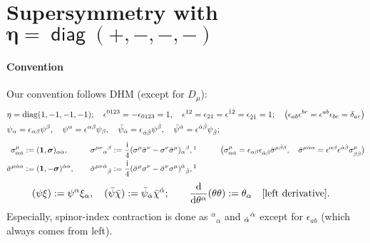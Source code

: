 \documentclass[CheatSheet]{subfiles}
\begin{document}
\section[Supersymmetry with $\eta=\diag(+,-,-,-)$]{Supersymmetry with $\bm{\eta=\mathop{\mathsf{diag}}(+,-,-,-)}$}

\paragraph{Convention} Our convention follows DHM (except for $D_\mu$):
\begin{align*}
 &
  \eta = \operatorname{\mathrm{diag}}(1, -1, -1, -1);
\quad
  \epsilon^{0123}=-\epsilon_{0123}=1,
\quad
 \epsilon^{12} = \epsilon_{21} = \epsilon^{\dot 1\dot 2} = \epsilon_{\dot2\dot1} = 1;
\quad
\bigl(\epsilon_{ab}\epsilon^{bc}=\epsilon^{ab}\epsilon_{bc}=\delta_{ac}\bigr)
\\&
\psi_\alpha = \epsilon_{\alpha\beta}\psi^\beta,
\quad
\psi^\alpha = \epsilon^{\alpha\beta}\psi_\beta,
\quad
\bar\psi_{\dot\alpha} = \epsilon_{\dot\alpha\dot\beta}\psi^{\dot \beta},
\quad
\bar\psi^{\dot\alpha} = \epsilon^{\dot\alpha\dot\beta}\psi_{\dot \beta};
\end{align*}\vspace{-18pt}
\begin{alignat*}{3}
\sigma^\mu_{\alpha\dalpha} &:= (\vc{1},\vc{\sigma})_{\alpha\dalpha},
\qquad&
\sigma^{\mu\nu}{}_\alpha{}^\beta &:= \frac{\ii}{4} (\sigma^\mu\bsigma^\nu-\sigma^\nu\bsigma^\mu)_{\alpha}{}^{\beta},\footnotemark
\qquad&
&\bigl(
\sigma^\mu_{\alpha\dalpha} = \epsilon_{\alpha\beta}\epsilon_{\dalpha\dbeta}\bsigma^{\mu\dbeta\beta},\quad
\bsigma^{\mu\dalpha\alpha} = \epsilon^{\alpha\beta}\epsilon^{\dalpha\dbeta}\sigma^\mu_{\beta\dbeta}\bigr)
\\
\bsigma^{\mu\dalpha\alpha} &:= (\vc{1},-\vc{\sigma})^{\dalpha\alpha},
&
\bsigma^{\mu\nu}{}^{\dalpha}{}_{\dbeta} &:= \frac{\ii}{4} (\bsigma^\mu\sigma^\nu-\bsigma^\nu\sigma^\mu)^{\dalpha}{}_{\dbeta},\addtocounter{footnote}{-1}\footnotemark
\qquad&
\end{alignat*}\vspace{-18pt}
\begin{align*}
&(\psi\xi):=\psi^\alpha\xi_\alpha,
\quad
 (\bar\psi\bar\chi):=\bar\psi_{{\dot\alpha}}\bar\chi^{{\dot\alpha}};
\qquad
\frac{\mathop{}\!\mathrm{d}}{\mathop{}\!\mathrm{d}\theta^\alpha}(\theta\theta) := \theta_\alpha\quad\text{[left derivative]}.
\end{align*}
Especially, spinor-index contraction is done as ${}^\alpha{}_\alpha$ and  ${}_{{\dot\alpha}}{}^{{\dot\alpha}}$ except for $\epsilon_{ab}$ (which always comes from left).
%
\end{document}
